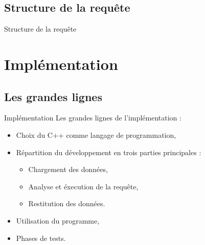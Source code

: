 \documentclass[10pt,handout]{beamer}
\newif\ifplacelogo %
\begin{document}
\subsection{Structure de la requête}

\placelogofalse
\begin{frame}{Structure de la requête}
\end{frame}
\placelogotrue



\section{Implémentation}

\subsection{Les grandes lignes}

\begin{frame}{Implémentation}
  Les grandes lignes de l'implémentation :
  \begin{itemize}
    \item Choix du C++ comme langage de programmation,
    \item Répartition du développement en trois parties principales :
    \begin{itemize}
      \item Chargement des données,
      \item Analyse et éxecution de la requête,
      \item Restitution des données.
    \end{itemize}
    \item Utilisation du programme,
    \item Phases de tests.
  \end{itemize}
\end{frame}
\end{document}
